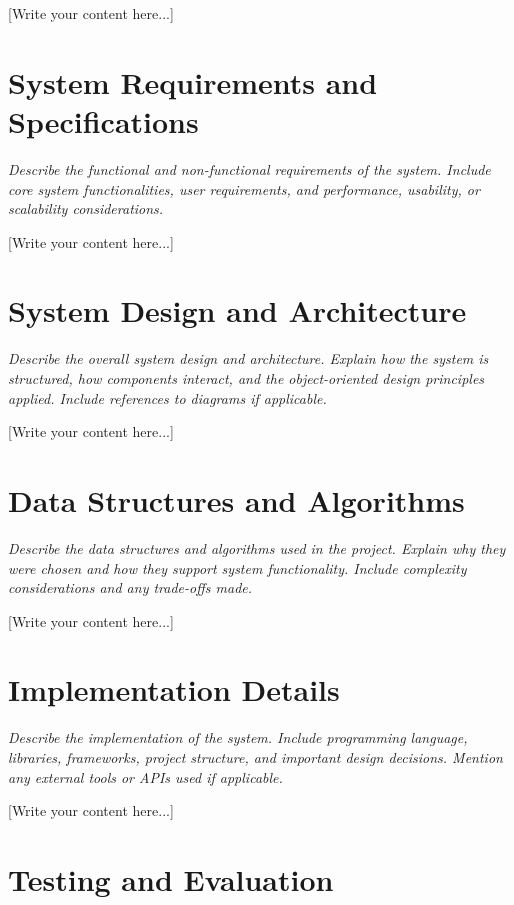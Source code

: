 \documentclass[12pt,oneside,openany,dvipsnames]{article}
\begin{document}
[Write your content here...]

\section{System Requirements and Specifications}

\textit{Describe the functional and non-functional requirements of the system. Include core system functionalities, user requirements, and performance, usability, or scalability considerations.}

[Write your content here...]

\section{System Design and Architecture}

\textit{Describe the overall system design and architecture. Explain how the system is structured, how components interact, and the object-oriented design principles applied. Include references to diagrams if applicable.}

[Write your content here...]

\section{Data Structures and Algorithms}

\textit{Describe the data structures and algorithms used in the project. Explain why they were chosen and how they support system functionality. Include complexity considerations and any trade-offs made.}

[Write your content here...]

\section{Implementation Details}

\textit{Describe the implementation of the system. Include programming language, libraries, frameworks, project structure, and important design decisions. Mention any external tools or APIs used if applicable.}

[Write your content here...]

\section{Testing and Evaluation}
\end{document}

